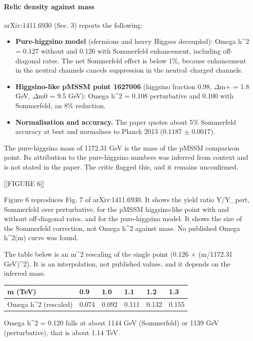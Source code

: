 \documentclass[11pt,a4paper]{article}
\begin{document}
\paragraph{Relic density against mass}
arXiv:1411.6930 (Sec. 3) reports the following:

\begin{itemize}
  \item \textbf{Pure-higgsino model} (sfermions and heavy Higgses decoupled): Omega h\textasciicircum{}2 = 0.127 without and 0.126 with Sommerfeld enhancement, including off-diagonal rates. The net Sommerfeld effect is below 1\%, because enhancement in the neutral channels cancels suppression in the neutral--charged channels.
  \item \textbf{Higgsino-like pMSSM point 1627006} (higgsino fraction 0.98, $\Delta$m+ = 1.8 GeV, $\Delta$m0 = 9.5 GeV): Omega h\textasciicircum{}2 = 0.108 perturbative and 0.100 with Sommerfeld, an 8\% reduction.
  \item \textbf{Normalisation and accuracy.} The paper quotes about 5\% Sommerfeld accuracy at best and normalises to Planck 2013 (0.1187 $\pm$ 0.0017).
\end{itemize}
The pure-higgsino mass of 1172.31 GeV is the mass of the pMSSM comparison point. Its attribution to the pure-higgsino numbers was inferred from context and is not stated in the paper. The critic flagged this, and it remains unconfirmed.

[[FIGURE 6]]

Figure 6 reproduces Fig. 7 of arXiv:1411.6930. It shows the yield ratio Y/Y\_pert, Sommerfeld over perturbative, for the pMSSM higgsino-like point with and without off-diagonal rates, and for the pure-higgsino model. It shows the size of the Sommerfeld correction, not Omega h\textasciicircum{}2 against mass. No published Omega h\textasciicircum{}2(m) curve was found.

The table below is an m\textasciicircum{}2 rescaling of the single point (0.126 $\times$ (m/1172.31 GeV)\textasciicircum{}2). It is an interpolation, not published values, and it depends on the inferred mass.

\begin{longtable}{@{}p{}p{}p{}p{}p{}p{}@{}}
\toprule
\textbf{m (TeV)} & \textbf{0.9} & \textbf{1.0} & \textbf{1.1} & \textbf{1.2} & \textbf{1.3} \\ \midrule \endhead
Omega h\textasciicircum{}2 (rescaled) & 0.074 & 0.092 & 0.111 & 0.132 & 0.155 \\
\bottomrule\end{longtable}
Omega h\textasciicircum{}2 = 0.120 falls at about 1144 GeV (Sommerfeld) or 1139 GeV (perturbative), that is about 1.14 TeV.
\end{document}
